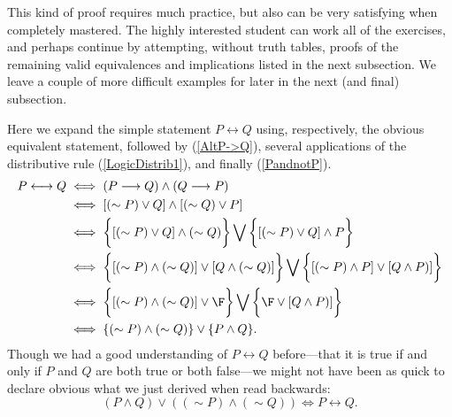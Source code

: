 This kind of proof requires much practice, but also can be
very satisfying when completely mastered.  The highly interested student
can work all of the exercises, and perhaps continue by attempting,
without truth tables, 
proofs of the remaining valid equivalences and implications listed in the 
next subsection.  We leave a couple of more difficult examples
for later in the next (and final) subsection.

\bex Here we expand the simple statement $P\longleftrightarrow Q$
using, respectively, the obvious equivalent statement, followed by 
(\ref{AltP->Q}), several applications of the distributive
rule (\ref{LogicDistrib1}),  and finally (\ref{PandnotP}).     
\begin{align*}
P\longleftrightarrow Q&\iff
(P\longrightarrow Q)\wedge(Q\longrightarrow P)\\
&\iff [(\sim P)\vee Q]\wedge[(\sim Q)\vee P]\\
&\iff\left\{\vphantom{\frac11}[(\sim P)\vee Q]
          \wedge(\sim Q)\right\}\bigvee
\left\{\vphantom{\frac11} [(\sim P)\vee Q]\wedge P\right\}\\ 
&\iff\left\{\vphantom{\frac11}[(\sim P)\wedge(\sim Q)]\vee[Q\wedge(\sim Q)]
       \right\}\bigvee
        \left\{\vphantom{\frac11}[(\sim P)\wedge P]\vee[Q\wedge P)]\right\}\\
&\iff \left\{\vphantom{\frac11}[(\sim P)\wedge(\sim Q)]\vee\F\right\}
       \bigvee
        \left\{\vphantom{\frac11}\F\vee[Q\wedge P)]\right\}\\
&\iff \{(\sim P)\wedge(\sim Q)\}\vee\{P\wedge Q\}.
\end{align*} 
Though we had a good understanding of $P\longleftrightarrow Q$ 
before---that it is true if and only if $P$ and $Q$ are both
true or both false---we might not have been as quick to
declare  obvious what we just derived when read backwards:
\begin{equation}
(P\wedge Q)\vee((\sim P)\wedge(\sim Q))\iff P\longleftrightarrow Q.
\end{equation}
\eex

